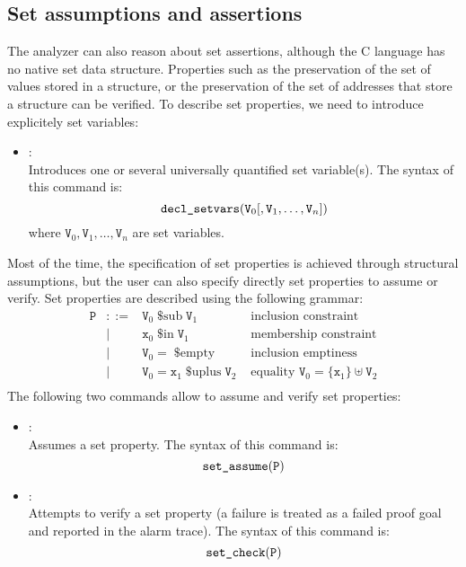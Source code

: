 \subsection{Set assumptions and assertions}
The \memcad analyzer can also reason about set assertions, although
the C language has no native set data structure.
Properties such as the preservation of the set of values stored in a
structure, or the preservation of the set of addresses that store a
structure can be verified.
To describe set properties, we need to introduce explicitely set
variables:
\begin{itemize}
\item[\dcommand{decl\textunderscore setvars}]: \\
  Introduces one or several universally quantified set variable(s).
  The syntax of this command is:
  \[
  \texttt{decl\_setvars}( \texttt{V}_0 [, \texttt{V}_1, \ldots,
  \texttt{V}_n ] )
  \]
  where \( \texttt{V}_0, \texttt{V}_1, \ldots, \texttt{V}_n \) are
  set variables.
\end{itemize}
Most of the time, the specification of set properties is achieved
through structural assumptions, but the user can also specify directly
set properties to assume or verify.
Set properties are described using the following grammar:
\[
\begin{array}{rcll}
  \texttt{P}
  & ::=
  & \texttt{V}_0 \mathop{\texttt{\$sub}} \texttt{V}_1
  & \text{ inclusion constraint}
  \\
  & |
  & \texttt{x}_0 \mathop{\texttt{\$in}} \texttt{V}_1
  & \text{ membership constraint}
  \\
  & |
  & \texttt{V}_0 = \mathop{\texttt{\$empty}}
  & \text{ inclusion emptiness}
  \\
  & |
  & \texttt{V}_0 = \texttt{x}_1 \mathop{\texttt{\$uplus}} \texttt{V}_2
  & \text{ equality } \texttt{V}_0 = \{ \texttt{x}_1 \} \uplus \texttt{V}_2
  \\
\end{array}
\]
The following two commands allow to assume and verify set properties:
\begin{itemize}
\item[\dcommand{set\textunderscore assume}]: \\
  Assumes a set property.
  The syntax of this command is:
  \[
  \texttt{set\_assume}( \texttt{P} )
  \]
\item[\dcommand{set\textunderscore check}]: \\
  Attempts to verify a set property (a failure is treated as a failed
  proof goal and reported in the alarm trace).
  The syntax of this command is:
  \[
  \texttt{set\_check}( \texttt{P} )
  \]
\end{itemize}

